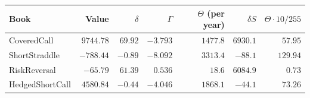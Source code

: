 \begin{tabular}{lrrrrrr}
\toprule
Book & Value & $\delta$ & $\Gamma$ & $\Theta$ (per year) & $\delta S$ & $\Theta\cdot 10/255$ \\
\midrule
CoveredCall & $9744.78$ & $69.92$ & $-3.793$ & $1477.8$ & $6930.1$ & $57.95$ \\
ShortStraddle & $-788.44$ & $-0.89$ & $-8.092$ & $3313.4$ & $-88.1$ & $129.94$ \\
RiskReversal & $-65.79$ & $61.39$ & $0.536$ & $18.6$ & $6084.9$ & $0.73$ \\
HedgedShortCall & $4580.84$ & $-0.44$ & $-4.046$ & $1868.1$ & $-44.1$ & $73.26$ \\
\bottomrule
\end{tabular}
